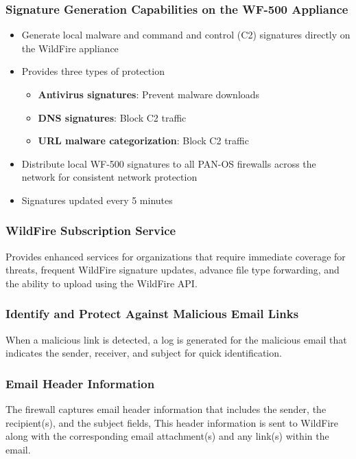 \subsubsection{Signature Generation Capabilities on the WF-500 Appliance}
\begin{itemize}
    \item Generate local malware and command and control (C2) signatures directly on the WildFire appliance
    \item Provides three types of protection
        \begin{itemize}
            \item \textbf{Antivirus signatures}: Prevent malware downloads
            \item \textbf{DNS signatures}: Block C2 traffic
            \item \textbf{URL malware categorization}: Block C2 traffic
        \end{itemize}
    \item Distribute local WF-500 signatures to all PAN-OS firewalls across the network for consistent network protection
    \item Signatures updated every 5 minutes
\end{itemize}

\subsubsection{WildFire Subscription Service}
Provides enhanced services for organizations that require immediate coverage for threats, frequent WildFire signature updates, advance file type forwarding, and the ability to upload using the WildFire API.

\subsubsection{Identify and Protect Against Malicious Email Links}
When a malicious link is detected, a log is generated for the malicious email that indicates the sender, receiver, and subject for quick identification.

\subsubsection{Email Header Information}
The firewall captures email header information that includes the sender, the recipient(s), and the subject fields,
This header information is sent to WildFire along with the corresponding email attachment(s) and any link(s) within the email. 


